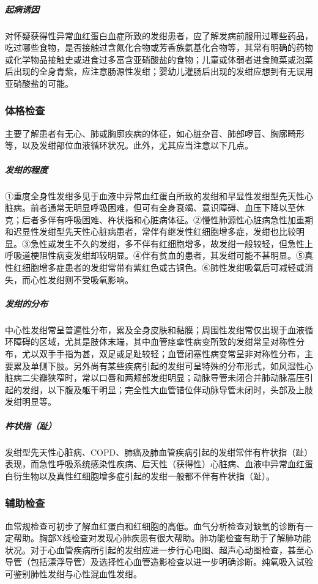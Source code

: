 \subparagraph{起病诱因}

对怀疑获得性异常血红蛋白血症所致的发绀患者，应了解发病前服用过哪些药品，吃过哪些食物，是否接触过含氮化合物或芳香族氨基化合物等，其常有明确的药物或化学物品接触史或进食过多富含亚硝酸盐的食物；儿童或体弱者进食腌菜或泡菜后出现的全身青紫，应注意肠源性发绀；婴幼儿灌肠后出现的发绀应想到有无误用亚硝酸盐的可能。

\subsubsection{体格检查}

主要了解患者有无心、肺或胸廓疾病的体征，如心脏杂音、肺部啰音、胸廓畸形等，以及发绀部位血液循环状况。此外，尤其应当注意以下几点。

\subparagraph{发绀的程度}

①重度全身性发绀多见于血液中异常血红蛋白所致的发绀和早显性发绀型先天性心脏病。前者通常无明显呼吸困难，但可有全身衰竭、意识障碍、血压下降以至休克；后者多伴有呼吸困难、杵状指和心脏病体征。②慢性肺源性心脏病急性加重期和迟显性发绀型先天性心脏病患者，常伴有继发性红细胞增多症，发绀也比较明显。③急性或发生不久的发绀，多不伴有红细胞增多，故发绀一般较轻，但急性上呼吸道梗阻性病变发绀却较明显。④伴有贫血的患者，其发绀可能不甚明显。⑤真性红细胞增多症患者的发绀常带有紫红色或古铜色。⑥肺性发绀吸氧后可减轻或消失，而心性发绀则不受吸氧影响。

\subparagraph{发绀的分布}

中心性发绀常呈普遍性分布，累及全身皮肤和黏膜；周围性发绀常仅出现于血液循环障碍的区域，尤其是肢体末端，其中血管痉挛性病变所致的发绀常呈对称性分布，尤以双手手指为甚，双足或足趾较轻；血管闭塞性病变常呈非对称性分布，主要累及单侧下肢。另外尚有某些疾病引起的发绀可呈特殊的分布形式，如风湿性心脏病二尖瓣狭窄时，常以口唇和两颊部发绀明显；动脉导管未闭合并肺动脉高压引起的发绀，以下腹及躯干明显；完全性大血管错位伴动脉导管未闭时，头部及上肢发绀明显等。

\subparagraph{杵状指（趾）}

发绀型先天性心脏病、COPD、肺癌及肺血管疾病引起的发绀常伴有杵状指（趾）表现，而急性呼吸系统感染性疾病、后天性（获得性）心脏病、血液中异常血红蛋白衍生物以及真性红细胞增多症引起的发绀一般都不伴有杵状指（趾）。

\subsubsection{辅助检查}

血常规检查可初步了解血红蛋白和红细胞的高低。血气分析检查对缺氧的诊断有一定帮助。胸部X线检查对发现心肺疾患有很大帮助。肺功能检查有助于了解肺功能状况。对于心血管疾病所引起的发绀应进一步行心电图、超声心动图检查，甚至心导管（包括漂浮导管）及选择性心血管造影检查以进一步明确诊断。纯氧吸入试验可鉴别肺性发绀与心性混血性发绀。

